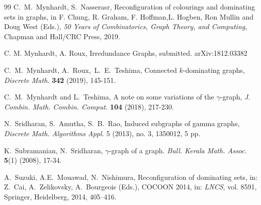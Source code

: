 \documentclass[12pt]{article}%
\begin{document}
\begin{thebibliography}{99}
C.~M.~Mynhardt, S.~Nasserasr, Reconfiguration of colourings and
dominating sets in graphs, in F. Chung, R. Graham, F. Hoffman,L. Hogben, Ron
Mullin and Doug West (Eds.), \emph{50 Years of Combinatorics, Graph Theory,
and Computing}, Chapman and Hall/CRC Press, 2019.

C. M. Mynhardt, A. Roux, Irredundance Graphs, submitted. arXiv:1812.03382

C.~M.~Mynhardt, A.~Roux,\ L.~E.~Teshima, Connected
$k$-dominating graphs, \emph{Discrete Math. }\textbf{342} (2019), 145-151.

C.~M.~Mynhardt and L.~Teshima, A note on some variations of
the $\gamma$-graph, \emph{J. Combin. Math. Combin. Comput. }\textbf{104
}(2018), 217-230.

N.~Sridharan, S.~Amutha, S.~B.~Rao, Induced subgraphs of gamma
graphs, \emph{Discrete Math. Algorithms Appl.} 5 (2013), no. 3, 1350012, 5 pp.

K.~Subramanian, N.~Sridharan, $\gamma$-graph of a graph.
\emph{Bull. Kerala Math. Assoc.} \textbf{5}(1) (2008), 17-34.

A.~Suzuki, A.E.~Mouawad, N.~Nishimura, Reconfiguration of
dominating sets, in: Z.~Cai, A.~Zelikovsky, A.~Bourgeois (Eds.), COCOON 2014,
in: \emph{LNCS}, vol. 8591, Springer, Heidelberg, 2014, 405--416.
\end{thebibliography}
\end{document}
